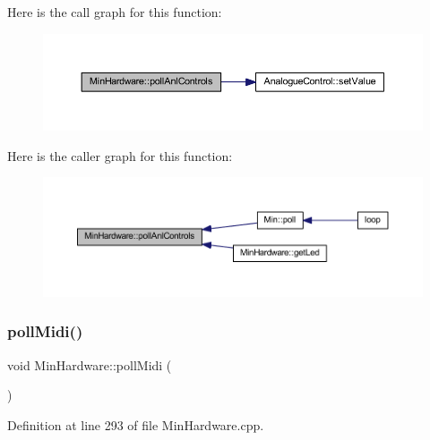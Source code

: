 Here is the call graph for this function\+:
\nopagebreak
\begin{figure}[H]
\begin{center}
\leavevmode
\includegraphics[width=350pt]{class_min_hardware_afa6cdaaab625ffd44c733c6ff9e29f4d_cgraph}
\end{center}
\end{figure}
Here is the caller graph for this function\+:
\nopagebreak
\begin{figure}[H]
\begin{center}
\leavevmode
\includegraphics[width=350pt]{class_min_hardware_afa6cdaaab625ffd44c733c6ff9e29f4d_icgraph}
\end{center}
\end{figure}
\mbox{\label{class_min_hardware_a4978945a745e4c2690e05789eff52976}} 
\subsubsection{\texorpdfstring{poll\+Midi()}{pollMidi()}}
{\footnotesize\ttfamily void Min\+Hardware\+::poll\+Midi (\begin{DoxyParamCaption}{ }\end{DoxyParamCaption})}



Definition at line 293 of file Min\+Hardware.\+cpp.

